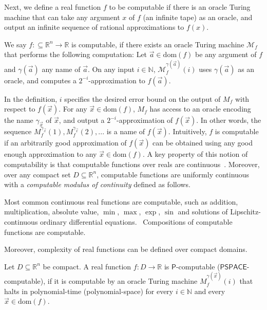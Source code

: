 \documentclass[envcountsect]{llncs}
\newcommand{\dom}{\mathrm{dom}}
\begin{document}
Next, we define a real function $f$ to be computable if there is an oracle Turing machine that can take any argument $x$ of $f$ (an infinite tape) as an oracle, and output an infinite sequence of rational approximations to $f(x)$. 

\begin{definition} We say $f:\subseteq\mathbb{R}^n\rightarrow \mathbb{R}$ is computable, if there exists an oracle Turing machine $\mathcal{M}_f$ that performs the following computation: Let $\vec a\in \dom(f)$ be any argument of $f$ and $\gamma(\vec a)$ any name of $\vec a$. On any input $i\in \mathbb{N}$, $\mathcal{M}_f^{\gamma(\vec a)}(i)$ uses $\gamma(\vec a)$ as an oracle, and computes a $2^{-i}$-approximation to $f(\vec a)$. 
\end{definition}



In the definition, $i$ specifies the desired error bound on the output of $M_f$ with respect to $f(\vec x)$. For any $\vec x\in \dom(f)$, $M_f$ has access to an oracle encoding the name $\gamma_{\vec x}$ of $\vec x$, and output a $2^{-i}$-approximation of $f(\vec x)$. In other words, the sequence $M_f^{\gamma_{\vec x}}(1), M_f^{\gamma_{\vec x}}(2), ...$ is a name of $f(\vec x)$. Intuitively, $f$ is computable if an arbitrarily good approximation of $f(\vec x)$ can be obtained using any good enough approximation to any $\vec x\in\dom(f)$. A key property of this notion of computability is that computable functions over reals are continuous~\cite{CAbook}. Moreover, over any compact set $D\subseteq \mathbb{R}^n$, computable functions are uniformly continuous with a {\em computable modulus of continuity} defined as follows. 

Most common continuous real functions are computable, such as addition, multiplication, absolute value, $\min$, $\max$, $\exp$, $\sin$ and solutions of Lipschitz-continuous ordinary differential equations.~\cite{CAbook} Compositions of computable functions are computable.


Moreover, complexity of real functions can be defined over compact domains. 

\begin{definition}[\cite{Ko92}] Let $D\subseteq \mathbb{R}^n$ be compact. A real function $f:D\rightarrow\mathbb{R}$ is $\mathsf{P}$-computable ($\mathsf{PSPACE}$-computable), if it is computable by an oracle Turing machine $M_{f}^{\gamma(\vec x)}(i)$ that halts in polynomial-time (polynomial-space) for every $i\in \mathbb{N}$ and every $\vec x\in \dom(f)$. 
\end{definition}
\end{document}
